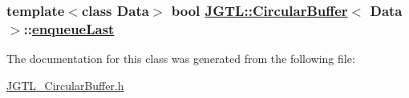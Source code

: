 \hypertarget{class_j_g_t_l_1_1_circular_buffer_4f4fc63fe5f774cc8e5ab94e3e7177d4}{
\subsubsection[enqueueLast]{\setlength{\rightskip}{0pt plus 5cm}template$<$class Data$>$ bool \hyperlink{class_j_g_t_l_1_1_circular_buffer}{JGTL::Circular\-Buffer}$<$ Data $>$::\hyperlink{class_j_g_t_l_1_1_circular_buffer_4f4fc63fe5f774cc8e5ab94e3e7177d4}{enqueue\-Last}}}
\label{class_j_g_t_l_1_1_circular_buffer_4f4fc63fe5f774cc8e5ab94e3e7177d4}




The documentation for this class was generated from the following file:\begin{CompactItemize}
\item 
\hyperlink{_j_g_t_l___circular_buffer_8h}{JGTL\_\-Circular\-Buffer.h}\end{CompactItemize}
